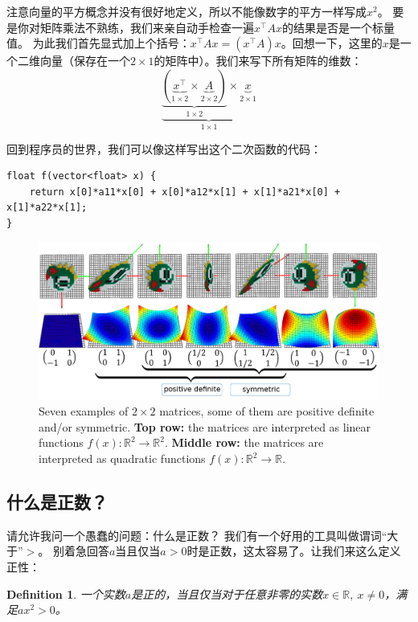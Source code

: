 \documentclass[notitlepage,oneside]{book}
\newtheorem{definition}{Definition}
\begin{document}
注意向量的平方概念并没有很好地定义，所以不能像数字的平方一样写成$x^2$。
要是你对矩阵乘法不熟练，我们来亲自动手检查一遍$x^\top A x$的结果是否是一个标量值。
为此我们首先显式加上个括号：$x^\top A x = (x^\top A) x$。回想一下，这里的$x$是一个二维向量（保存在一个$2\times 1$的矩阵中）。我们来写下所有矩阵的维数：
$$
\underbrace{\underbrace{\left(\underbrace{x^\top}_{1\times 2} \times \underbrace{A}_{2\times 2}\right)}_{1\times 2} \times \underbrace{x}_{2\times 1}}_{1 \times 1}
$$

回到程序员的世界，我们可以像这样写出这个二次函数的代码：
\begin{verbatim}
float f(vector<float> x) {
    return x[0]*a11*x[0] + x[0]*a12*x[1] + x[1]*a21*x[0] + x[1]*a22*x[1];
}
\end{verbatim}

\begin{figure}[ht]
	\centering
	\includegraphics[width=\linewidth]{img/matrices}
	\caption{Seven examples of $2\times 2$ matrices, some of them are positive definite and/or symmetric. 
    \textbf{Top row:} the matrices are interpreted as linear functions $f(x):\mathbb R^2 \rightarrow \mathbb R^2$. \textbf{Middle row:} the matrices are interpreted as quadratic functions
 $f(x):\mathbb R^2 \rightarrow \mathbb R$.}
	\label{fig:matrices}
\end{figure}


\subsection{什么是正数？}
请允许我问一个愚蠢的问题：什么是正数？
我们有一个好用的工具叫做谓词“大于”$>$。
别着急回答$a$当且仅当$a>0$时是正数，这太容易了。让我们来这么定义正性：

\begin{definition}
一个实数$a$是正的，当且仅当对于任意非零的实数$x\in\mathbb R,\ x\neq 0$，满足$ax^2>0$。
\end{definition}
\end{document}
